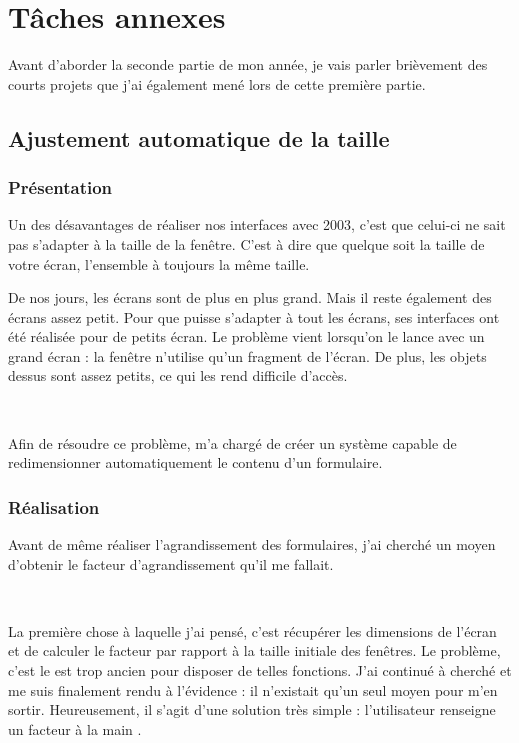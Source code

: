 \chapter{Tâches annexes}
Avant d'aborder la seconde partie de mon année, je vais parler brièvement des courts projets que j'ai également mené lors de cette première partie.

\section{Ajustement automatique de la taille}
\subsection{Présentation}
Un des désavantages de réaliser nos interfaces avec  2003, c'est que celui-ci ne sait pas s'adapter à la taille de la fenêtre. C'est à dire que quelque soit la taille de votre écran, l'ensemble à toujours la même taille.

De nos jours, les écrans sont de plus en plus grand. Mais il reste également des écrans assez petit. Pour que \integrale{} puisse s'adapter à tout les écrans, ses interfaces ont été réalisée pour de petits écran. Le problème vient lorsqu'on le lance avec un grand écran : la fenêtre n'utilise qu'un fragment de l'écran. De plus, les objets dessus sont assez petits, ce qui les rend difficile d'accès.

~

Afin de résoudre ce problème, \solulog{} m'a chargé de créer un système capable de redimensionner automatiquement le contenu d'un formulaire.

\subsection{Réalisation}
Avant de même réaliser l'agrandissement des formulaires, j'ai cherché un moyen d'obtenir le facteur d'agrandissement qu'il me fallait.

~

La première chose à laquelle j'ai pensé, c'est récupérer les dimensions de l'écran et de calculer le facteur par rapport à la taille initiale des fenêtres. Le problème, c'est le \vb{} est trop ancien pour disposer de telles fonctions. J'ai continué à cherché et me suis finalement rendu à l'évidence : il n'existait qu'un seul moyen pour m'en sortir. Heureusement, il s'agit d'une solution très simple : l'utilisateur renseigne un facteur \og à la main \fg.

